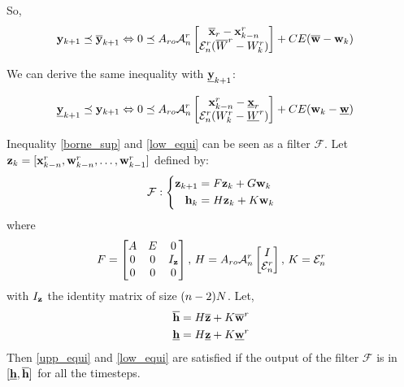 So,
\begin{equation}\label{upp_equi}
\begin{split}
 \mathbf{y}_{k+1} \preceq \overline{ \mathbf{y}}_{k+1}
& \Leftrightarrow
0 \preceq
A_{ro} \mathcal{A}^r_n
\begin{bmatrix}
\overline{ \mathbf{x}}_r -  \mathbf{x}^r_{k-n} \\
\mathcal{E}^r_n (\overline{W}^r - W^r_k)
\end{bmatrix}
+ C E (\overline{ \mathbf{w}} - \mathbf{w}_{k})
\end{split}
\end{equation}

We can derive the same inequality with $\underline{ \mathbf{y}}_{k+1}$:

\begin{equation}\label{low_equi}
\begin{split}
\underline{ \mathbf{y}}_{k+1} \preceq  \mathbf{y}_{k+1}
& \Leftrightarrow
0 \preceq
A_{ro} \mathcal{A}^r_n
\begin{bmatrix}
 \mathbf{x}^r_{k-n} - \underline{ \mathbf{x}}_r \\
\mathcal{E}^r_n (W^r_k - \underline{W}^r)
\end{bmatrix}
+ C E ( \mathbf{w}_{k} - \underline{ \mathbf{w}})
\end{split}
\end{equation}

\newcommand{\filter}{\mathcal{F}}
Inequality \ref{borne_sup} and \ref{low_equi} can be seen as a filter $\filter$. Let $ \mathbf{z}_k=[ \mathbf{x}^r_{k-n}, \mathbf{w}^r_{k-n},\dots, \mathbf{w}^r_{k-1}]$  defined by:
\begin{equation}
\filter:
\left\{
\begin{split}
\zkn &= F \zk + G \wk \\
\hk &= H \zk + K \wk \\
\end{split}
\right.
\end{equation}
where
\begin{equation}
F = \begin{bmatrix}
A & E & 0\\
0 & 0 & I_{ \mathbf{z}}\\
0 & 0 & 0 \\
\end{bmatrix}
\textrm{, }
H = 
A_{ro} \mathcal{A}^r_n
\begin{bmatrix}
I \\
\mathcal{E}^r_n
\end{bmatrix}
\textrm{, }
K = \mathcal{E}^r_n
\end{equation}
with $I_{ \mathbf{z}}$ the  identity matrix of size $(n-2)N$.
Let,
\begin{align*}
\overline{ \mathbf{h}} &= H \overline{ \mathbf{z}} + K \overline{ \mathbf{w}}^r\\
\underline{ \mathbf{h}} &= H \underline{ \mathbf{z}} + K \underline{ \mathbf{w}}^r
\end{align*}
Then \ref{upp_equi} and \ref{low_equi} are satisfied if the output of the filter $\filter$ is in $[\underline{ \mathbf{h}},\overline{ \mathbf{h}}]$ for all the timesteps.

